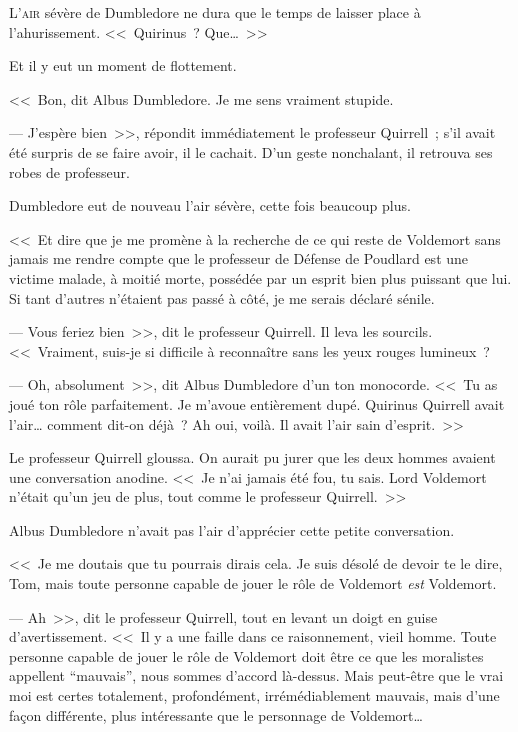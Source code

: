 
\lettrine{L}{'air} sévère de Dumbledore ne dura que le temps de laisser place à l'ahurissement. <<~Quirinus~? Que…~>>

Et il y eut un moment de flottement.

<<~Bon, dit Albus Dumbledore. Je me sens vraiment stupide.

--- J'espère bien~>>, répondit immédiatement le professeur Quirrell~; s'il avait été surpris de se faire avoir, il le cachait. D'un geste nonchalant, il retrouva ses robes de professeur.

Dumbledore eut de nouveau l'air sévère, cette fois beaucoup plus.

<<~Et dire que je me promène à la recherche de ce qui reste de Voldemort sans jamais me rendre compte que le professeur de Défense de Poudlard est une victime malade, à moitié morte, possédée par un esprit bien plus puissant que lui. Si tant d'autres n'étaient pas passé à côté, je me serais déclaré sénile.

--- Vous feriez bien~>>, dit le professeur Quirrell. Il leva les sourcils. <<~Vraiment, suis-je si difficile à reconnaître sans les yeux rouges lumineux~?

--- Oh, absolument~>>, dit Albus Dumbledore d'un ton monocorde. <<~Tu as joué ton rôle parfaitement. Je m'avoue entièrement dupé. Quirinus Quirrell avait l'air… comment dit-on déjà~? Ah oui, voilà. Il avait l'air sain d'esprit.~>>

Le professeur Quirrell gloussa. On aurait pu jurer que les deux hommes avaient une conversation anodine. <<~Je n'ai jamais été fou, tu sais. Lord Voldemort n'était qu'un jeu de plus, tout comme le professeur Quirrell.~>>

Albus Dumbledore n'avait pas l'air d'apprécier cette petite conversation.

<<~Je me doutais que tu pourrais dirais cela. Je suis désolé de devoir te le dire, Tom, mais toute personne capable de jouer le rôle de Voldemort \emph{est} Voldemort.

--- Ah~>>, dit le professeur Quirrell, tout en levant un doigt en guise d'avertissement. <<~Il y a une faille dans ce raisonnement, vieil homme. Toute personne capable de jouer le rôle de Voldemort doit être ce que les moralistes appellent “mauvais”, nous sommes d'accord là-dessus. Mais peut-être que le vrai moi est certes totalement, profondément, irrémédiablement mauvais, mais d'une façon différente, plus intéressante que le personnage de Voldemort…

